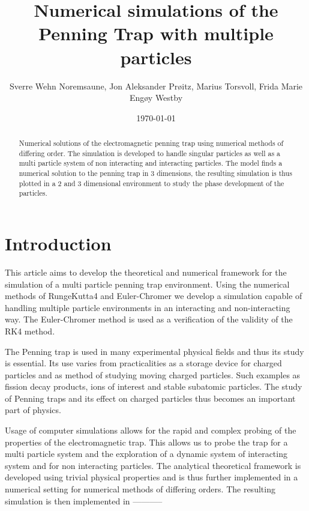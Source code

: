 \documentclass[english,notitlepage,reprint,nofootinbib]{revtex4-1}  %
\begin{document}
	
	\title{Numerical simulations of the Penning Trap with multiple particles}  %
	\author{Sverre Wehn Noremsaune, Jon Aleksander Prøitz, Marius Torsvoll, Frida Marie Engøy Westby} %
	\date{\today}                             %
	\noaffiliation                            %
	
	\begin{abstract}
		Numerical solutions of the electromagnetic penning trap using numerical methods of differing order. The simulation is developed to handle singular particles as well as a multi particle system of non interacting and interacting particles. The model finds a numerical solution to the penning trap in 3 dimensions, the resulting simulation is thus plotted in a 2 and 3 dimensional environment to study the phase development of the particles. 
	\end{abstract}
	\maketitle
	
	
	\section{Introduction}
	This article aims to develop the theoretical and numerical framework for the simulation of a multi particle penning trap environment. Using the numerical methods of RungeKutta4 and Euler-Chromer we develop a simulation capable of handling multiple particle environments in an interacting and non-interacting way. The Euler-Chromer method is used as a verification of the validity of the RK4 method. 
	
	The Penning trap is used in many experimental physical fields and thus its study is essential. Its use varies from practicalities as a storage device for charged particles and as method of studying moving charged particles. Such examples as fission decay products, ions of interest and stable subatomic particles. The study of Penning traps and its effect on charged particles thus becomes an important part of physics. 
	
	Usage of computer simulations allows for the rapid and complex probing of the properties of the electromagnetic trap. This allows us to probe the trap for a multi particle system and the exploration of a dynamic system of interacting system and for non interacting particles. The analytical theoretical framework is developed using trivial physical properties and is thus further implemented in a numerical setting for numerical methods of differing orders. The resulting simulation is then implemented in -----------
		
\end{document}
